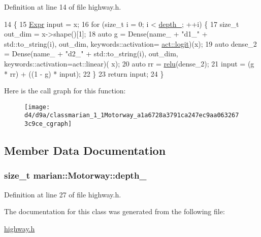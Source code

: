 Definition at line 14 of file highway.\+h.


\begin{DoxyCode}
14                             \{
15       \hyperlink{namespacemarian_a498d8baf75b754011078b890b39c8e12}{Expr} input = x;
16       \textcolor{keywordflow}{for} (\textcolor{keywordtype}{size\_t} i = 0; i < \hyperlink{classmarian_1_1Motorway_a384982b62bfffcef2bc23cbd74ebdf4a}{depth\_}; ++i) \{
17         \textcolor{keywordtype}{size\_t} out\_dim = x->shape()[1];
18         \textcolor{keyword}{auto} g = Dense(name\_ + \textcolor{stringliteral}{"d1\_"} + std::to\_string(i), out\_dim, keywords::activation=
      \hyperlink{namespacemarian_a72a6c5cedeadde602b3621a3450dbebe}{act::logit})(x);
19         \textcolor{keyword}{auto} dense\_2 = Dense(name\_ + \textcolor{stringliteral}{"d2\_"} + std::to\_string(i), out\_dim, keywords::activation=act::linear)(
      x);
20         \textcolor{keyword}{auto} rr = \hyperlink{namespacemarian_a6228f7e46aeed337e3886df6446b7840}{relu}(dense\_2);
21         input = (g * rr) + ((1 - g) * input);
22       \}
23       \textcolor{keywordflow}{return} input;
24     \}
\end{DoxyCode}


Here is the call graph for this function\+:
\nopagebreak
\begin{figure}[H]
\begin{center}
\leavevmode
\texttt{[image: d4/d9a/classmarian\_1\_1Motorway\_a1a6728a3791ca247ec9aa0632673c9ce\_cgraph]}
\end{center}
\end{figure}




\subsection{Member Data Documentation}
\subsubsection[{\texorpdfstring{depth\+\_\+}{depth_}}]{\setlength{\rightskip}{0pt plus 5cm}size\+\_\+t marian\+::\+Motorway\+::depth\+\_\+\hspace{0.3cm}{\ttfamily [protected]}}\hypertarget{classmarian_1_1Motorway_a384982b62bfffcef2bc23cbd74ebdf4a}{}\label{classmarian_1_1Motorway_a384982b62bfffcef2bc23cbd74ebdf4a}


Definition at line 27 of file highway.\+h.



The documentation for this class was generated from the following file\+:\begin{DoxyCompactItemize}
\item 
\hyperlink{highway_8h}{highway.\+h}\end{DoxyCompactItemize}

